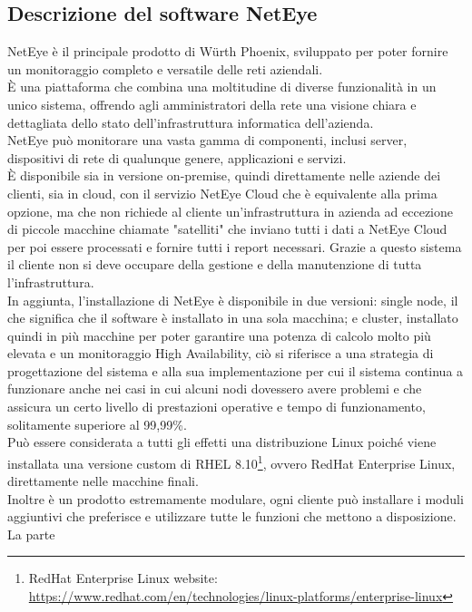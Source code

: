 \subsection{Descrizione del software NetEye}
\label{sub:neteye} NetEye è il principale prodotto di Würth Phoenix, sviluppato
per poter fornire un monitoraggio completo e versatile delle reti aziendali.\\ È
una piattaforma che combina una moltitudine di diverse funzionalità in un unico
sistema, offrendo agli amministratori della rete una visione chiara e dettagliata
dello stato dell'infrastruttura informatica dell'azienda.\\ NetEye può monitorare
una vasta gamma di componenti, inclusi server, dispositivi di rete di qualunque genere,
applicazioni e servizi.\\ È disponibile sia in versione on-premise, quindi direttamente
nelle aziende dei clienti, sia in cloud, con il servizio NetEye Cloud che è equivalente
alla prima opzione, ma che non richiede al cliente un'infrastruttura in azienda
ad eccezione di piccole macchine chiamate "satelliti" che inviano tutti i dati a
NetEye Cloud per poi essere processati e fornire tutti i report necessari. Grazie
a questo sistema il cliente non si deve occupare della gestione e della manutenzione
di tutta l'infrastruttura.\\ In aggiunta, l'installazione di NetEye è
disponibile in due versioni: single node, il che significa che il software è
installato in una sola macchina; e cluster, installato quindi in più macchine
per poter garantire una potenza di calcolo molto più elevata e un monitoraggio
High Availability, ciò si riferisce a una strategia di progettazione del sistema
e alla sua implementazione per cui il sistema continua a funzionare anche nei casi
in cui alcuni nodi dovessero avere problemi e che assicura un certo livello di prestazioni
operative e tempo di funzionamento, solitamente superiore al 99,99\%.\\ Può essere
considerata a tutti gli effetti una distribuzione Linux poiché viene installata una
versione custom di RHEL 8.10\footnote{RedHat Enterprise Linux website: \url{https://www.redhat.com/en/technologies/linux-platforms/enterprise-linux}},
ovvero RedHat Enterprise Linux, direttamente nelle macchine finali.\\ Inoltre è
un prodotto estremamente modulare, ogni cliente può installare i moduli aggiuntivi
che preferisce e utilizzare tutte le funzioni che mettono a disposizione.\\ La parte
